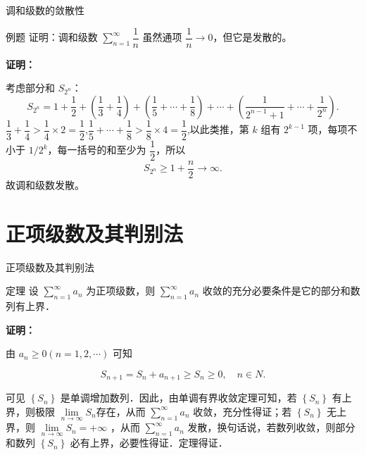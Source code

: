 \documentclass[aspectratio=169,10pt]{ctexbeamer}
\begin{document}
\begin{frame}{调和级数的敛散性}
	\begin{block}{例题}
		证明：调和级数 \(\sum\limits_{n = 1}^{  \infty } \dfrac{1}{n}\) 虽然通项 \(\dfrac{1}{n} \to 0\)，但它是发散的。
	\end{block}
	\pause
	
	\textbf{证明：}
	
	考虑部分和 \(S_{2^n}\)：
	\[
	S_{2^n} = 1 + \dfrac12 + \left(\dfrac13+\dfrac14\right) + \left(\dfrac15+\cdots+\dfrac18\right) + \cdots + \left(\dfrac{1}{2^{n-1}+1} + \cdots + \dfrac{1}{2^n}\right).
	\]
	$\dfrac13+\dfrac14 > \dfrac14 \times 2 =\dfrac12$,$\dfrac15+\cdots+\dfrac18>\dfrac18 \times 4 =\dfrac12$,以此类推，第 \(k\) 组有 \(2^{k-1}\) 项，每项不小于 \(1/2^k\)，每一括号的和至少为 \(\dfrac12\)，所以
	\[
	S_{2^n}\geq1+\dfrac n2\to\infty.
	\]
	故调和级数发散。
\end{frame}

\section{正项级数及其判别法}



\begin{frame}{正项级数及其判别法}
	
	\begin{block}{定理}
		设 $\sum\limits_{n = 1}^{  \infty } a_n$ 为正项级数，则 $\sum\limits_{n = 1}^{  \infty }a_n$ 收敛的充分必要条件是它的部分和数列有上界．
	\end{block}
	\vspace{0.6cm}
	
	
	\textbf{证明：}
	
	由 $a_n \geqslant 0(n=1,2, \cdots)$ 可知
	
	$$
	S_{n+1}=S_n+a_{n+1} \geqslant S_n \geqslant 0, \quad n \in N .
	$$
	
	可见 $\left\{S_n\right\}$ 是单调增加数列．因此，由单调有界收敛定理可知，若 $\left\{S_n\right\}$ 有上界，则极限 $\lim \limits_{n \to \infty} S_n$存在，从而 $\sum\limits_{n = 1}^{  \infty } a_n$ 收敛，充分性得证；若 $\left\{S_n\right\}$ 无上界，则 $\lim \limits_{n \to \infty} S_n=+\infty$ ，从而 $\sum\limits_{n = 1}^{  \infty } a_n$ 发散，换句话说，若数列收敛，则部分和数列 $\left\{S_n\right\}$ 必有上界，必要性得证．定理得证．
	
	
\end{frame}
\end{document}
